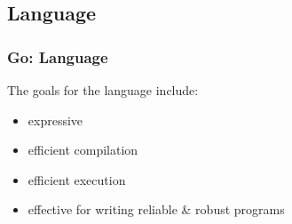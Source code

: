 \subsection{Language}

\begin{frame}[t]
  \frametitle{Go: Language}

  The goals for the language include:

  \begin{itemize}
  \item expressive
  \item efficient compilation
  \item efficient execution
  \item effective for writing reliable \& robust programs
  \end{itemize}
\end{frame}

